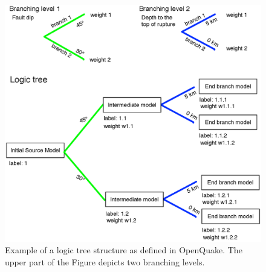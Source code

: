 %
\begin{figure}
\includegraphics[width=15cm]{./Figures/Part_Hazard/logic_tree_schema.eps}
\caption{Example of a logic tree structure as defined in OpenQuake. The upper
part of the Figure depicts two branching levels.}
\label{fig:logic_tree_schema}
\end{figure}
%

